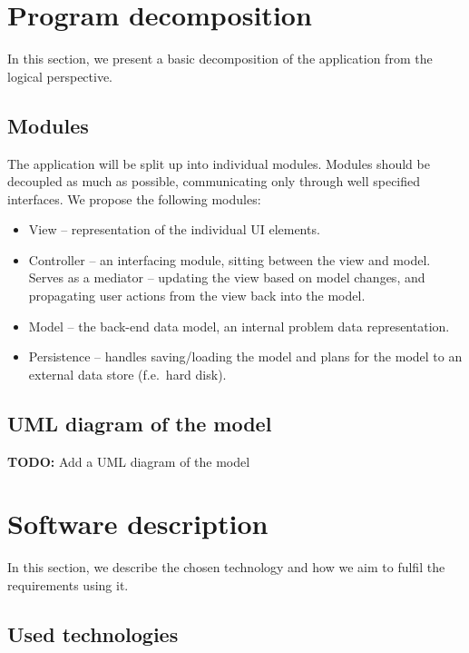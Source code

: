 \documentclass[10pt,a4paper,oneside]{article}
\newcommand{\TODO}[1]{{\textbf{TODO:} #1}} %
\begin{document}
\section{Program decomposition}

In this section, we present a basic decomposition of the application from the logical perspective.

\subsection{Modules} \label{modules}

The application will be split up into individual modules.
Modules should be decoupled as much as possible, communicating only through well specified interfaces.
We propose the following modules:

\begin{itemize}
\item View -- representation of the individual UI elements.
\item Controller -- an interfacing module, sitting between the view and model. Serves as a mediator -- updating the view based on model changes, and propagating user actions from the view back into the model.
\item Model -- the back-end data model, an internal problem data representation.
\item Persistence -- handles saving/loading the model and plans for the model to an external data store (f.e.~hard disk).
\end{itemize}

\subsection{UML diagram of the model}

\TODO Add a UML diagram of the model
 
 
 
 
 



\section{Software description}

In this section, we describe the chosen technology and how we aim to fulfil the requirements using it.

\subsection{Used technologies} \label{used-tech}
\end{document}
